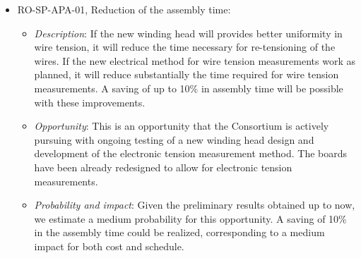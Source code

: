 \begin{itemize}
\item RO-SP-APA-01, Reduction of the  assembly time:
\begin{itemize} %
\item \textit{Description}: If the new winding head will provides better uniformity in wire tension, it will reduce the time necessary for re-tensioning of the wires. If the new electrical method for wire tension measurements work as planned, it will reduce substantially the time required for wire tension measurements. A saving of up to 10\% in  assembly time will be possible with these improvements. 
\item \textit{Opportunity}: This is an opportunity that the  Consortium is actively pursuing with ongoing testing of a new winding head design and development of the electronic tension measurement method. The  boards have been already redesigned to allow for electronic tension measurements. 
\item \textit{Probability and impact}: Given the preliminary results obtained up to now, we estimate a medium probability for this opportunity. A saving of 10\% in the  assembly time could be realized, corresponding to a medium impact for both cost and schedule.
\end{itemize}

\end{itemize}



